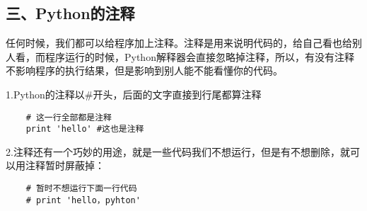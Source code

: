 \documentclass{article}
\begin{document}
\begin{CJK}{UTF8}{gbsn}
\part*{三、Python的注释}
\subparagraph*{}
任何时候，我们都可以给程序加上注释。注释是用来说明代码的，给自己看也给别人看，而程序运行的时候，Python解释器会直接忽略掉注释，所以，有没有注释不影响程序的执行结果，但是影响到别人能不能看懂你的代码。
\subparagraph*{}
1.Python的注释以\#{}开头，后面的文字直接到行尾都算注释
\begin{verbatim}
    # 这一行全部都是注释
    print 'hello' #这也是注释
\end{verbatim}
\subparagraph*{}
2.注释还有一个巧妙的用途，就是一些代码我们不想运行，但是有不想删除，就可以用注释暂时屏蔽掉：
\begin{verbatim}
    # 暂时不想运行下面一行代码
    # print 'hello，pyhton'
\end{verbatim}

\end{CJK}
\end{document}
